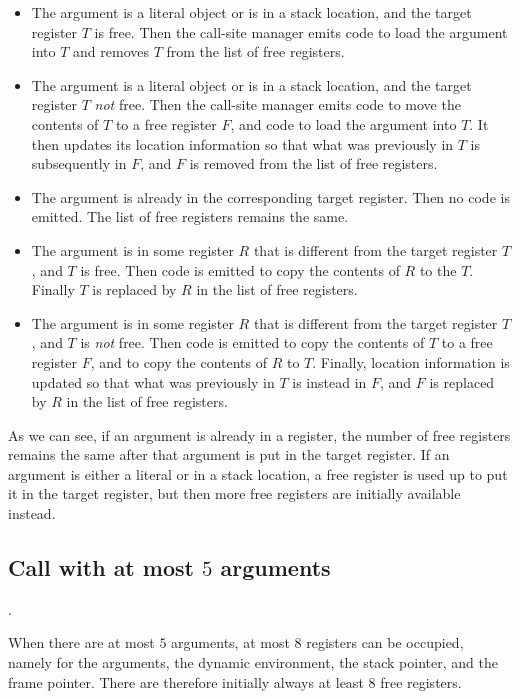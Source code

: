 \begin{itemize}
\item The argument is a literal object or is in a stack location, and
  the target register $T$ is free.  Then the call-site manager emits
  code to load the argument into $T$ and removes $T$ from the list of
  free registers.
\item The argument is a literal object or is in a stack location, and
  the target register $T$ \emph{not} free.  Then the call-site manager
  emits code to move the contents of $T$ to a free register $F$, and
  code to load the argument into $T$.  It then updates its location
  information so that what was previously in $T$ is subsequently in
  $F$, and $F$ is removed from the list of free registers.
\item The argument is already in the corresponding target register.
  Then no code is emitted.  The list of free registers remains the
  same.
\item The argument is in some register $R$ that is different from the
  target register $T$, and $T$ is free.  Then code is emitted to copy
  the contents of $R$ to the $T$.  Finally $T$ is replaced by $R$ in
  the list of free registers.
\item The argument is in some register $R$ that is different from the
  target register $T$, and $T$ is \emph{not} free.  Then code is
  emitted to copy the contents of $T$ to a free register $F$, and to
  copy the contents of $R$ to $T$.  Finally, location information is
  updated so that what was previously in $T$ is instead in $F$, and
  $F$ is replaced by $R$ in the list of free registers.
\end{itemize}

As we can see, if an argument is already in a register, the number of
free registers remains the same after that argument is put in the
target register.  If an argument is either a literal or in a stack
location, a free register is used up to put it in the target register,
but then more free registers are initially available instead.

\subsection{Call with at most $5$ arguments}.

When there are at most $5$ arguments, at most $8$ registers can be
occupied, namely for the arguments, the dynamic environment, the stack
pointer, and the frame pointer.  There are therefore initially always
at least $8$ free registers.

